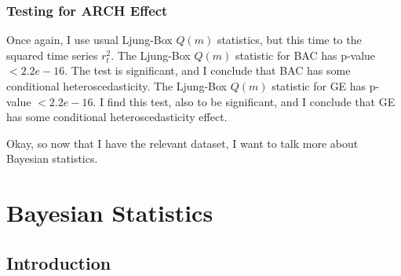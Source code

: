\documentclass[a4paper,11pt,english]{article}
\begin{document}
			
			\subsubsection{Testing for ARCH Effect}
		  
			Once again, I use usual Ljung-Box $Q(m)$ statistics, but this time to the squared time series $r^2_t$. The Ljung-Box $Q(m)$ statistic for BAC 
			has p-value $< 2.2e-16$. The test is significant, and I conclude that BAC has some conditional heteroscedasticity. The Ljung-Box $Q(m)$ 
			statistic for GE has p-value $< 2.2e-16$. I find this test, also to be significant, and I conclude that GE has some conditional 
			heteroscedasticity effect.  \vspace{0.3cm}
			
			Okay, so now that I have the relevant dataset, I want to talk more about Bayesian statistics.  





	\section{Bayesian Statistics} \label{sec:bayesianstatistics}


		\subsection{Introduction}						
\end{document}
